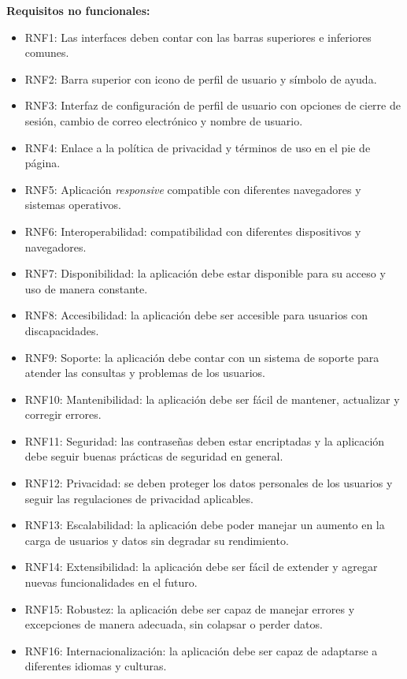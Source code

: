 \textbf{Requisitos no funcionales:}

\begin{itemize}
    \item RNF1: Las interfaces deben contar con las barras superiores e inferiores comunes.
    \item RNF2: Barra superior con icono de perfil de usuario y símbolo de ayuda.
    \item RNF3: Interfaz de configuración de perfil de usuario con opciones de cierre de sesión, cambio de correo electrónico y nombre de usuario.
    \item RNF4: Enlace a la política de privacidad y términos de uso en el pie de página.
    \item RNF5: Aplicación \textit{responsive} compatible con diferentes navegadores y sistemas operativos.
    \item RNF6: Interoperabilidad: compatibilidad con diferentes dispositivos y navegadores.
    \item RNF7: Disponibilidad: la aplicación debe estar disponible para su acceso y uso de manera constante.
    \item RNF8: Accesibilidad: la aplicación debe ser accesible para usuarios con discapacidades.
    \item RNF9: Soporte: la aplicación debe contar con un sistema de soporte para atender las consultas y problemas de los usuarios.
    \item RNF10: Mantenibilidad: la aplicación debe ser fácil de mantener, actualizar y corregir errores.
    \item RNF11: Seguridad: las contraseñas deben estar encriptadas y la aplicación debe seguir buenas prácticas de seguridad en general.
    \item RNF12: Privacidad: se deben proteger los datos personales de los usuarios y seguir las regulaciones de privacidad aplicables.
    \item RNF13: Escalabilidad: la aplicación debe poder manejar un aumento en la carga de usuarios y datos sin degradar su rendimiento.
    \item RNF14: Extensibilidad: la aplicación debe ser fácil de extender y agregar nuevas funcionalidades en el futuro.
    \item RNF15: Robustez: la aplicación debe ser capaz de manejar errores y excepciones de manera adecuada, sin colapsar o perder datos.
    \item RNF16: Internacionalización: la aplicación debe ser capaz de adaptarse a diferentes idiomas y culturas.
\end{itemize}


